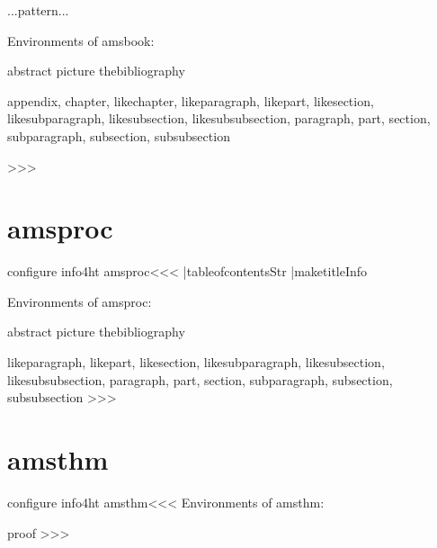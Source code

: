 {{{{\begin{tabular / array}{...pattern...}
\begin{...}
Environments of amsbook:

   abstract
   picture
   thebibliography

  \ConfigureToc
  
  appendix, chapter, likechapter, likeparagraph, likepart,
  likesection, likesubparagraph, likesubsection, likesubsubsection,
  paragraph, part, section, subparagraph, subsection, subsubsection

>>>

\section{amsproc}
                
\<configure info4ht amsproc\><<<
|tableofcontentsStr
|maketitleInfo

%

Environments of amsproc:

   abstract
   picture
   thebibliography

  \ConfigureToc
  
  likeparagraph, likepart, likesection, likesubparagraph,
  likesubsection, likesubsubsection, paragraph, part, section,
  subparagraph, subsection, subsubsection
>>>


\section{amsthm}
                
\<configure info4ht amsthm\><<<
Environments of amsthm:

   proof
>>>





\end{...}
\end{tabular / array}}}}}

